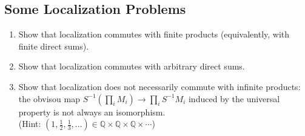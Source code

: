 \documentclass[hidelinks,12pt]{article}
\newcommand{\Q}{\mathbb{Q}}
\begin{document}
\subsection{Some Localization Problems} \begin{enumerate}[label=(\alph*)]
    \item Show that localization commutes with finite products (equivalently, with finite direct sums).
    \item Show that localization commutes with arbitrary direct sums.
    \item Show that localization does not necessarily commute with infinite products: the obvisou map \(S^{-1}(\prod_{i}M_{i})\to\prod_{i}S^{-1}M_{i}\) induced by the universal property is not always an isomorphism. \\(Hint: \((1,\frac{1}{2},\frac{1}{3},\dots)\in\Q\times\Q\times\Q\times\cdots\))
\end{enumerate}
\end{document}
